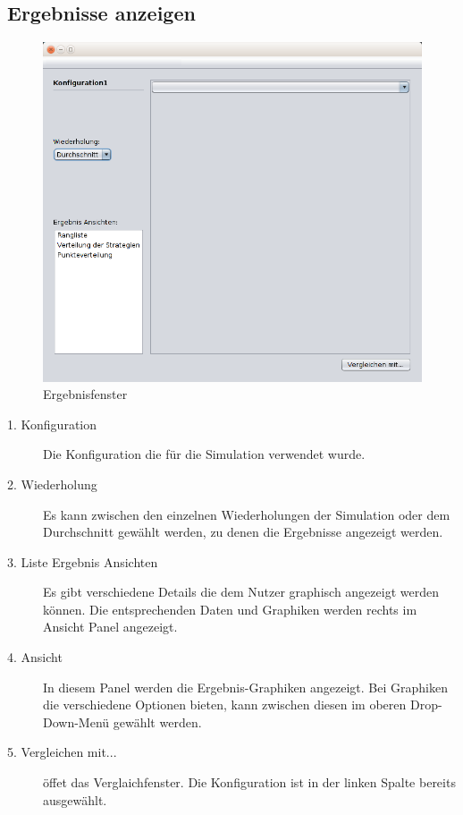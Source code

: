\pagebreak


\subsection{Ergebnisse anzeigen}

\begin{figure}[!hp] 
  \centering
     \includegraphics[width=1.1\textwidth]{GUI_Entwurf/Ergebnisfenster(1).png}
  \caption{Ergebnisfenster}
  \label{fig:Bild7}
\end{figure}

\begin{description}

\item[1. Konfiguration] Die Konfiguration die für die Simulation verwendet wurde.

\item[2. Wiederholung] Es kann zwischen den einzelnen Wiederholungen der Simulation oder dem Durchschnitt gewählt werden, zu denen die Ergebnisse angezeigt werden.

\item[3. Liste Ergebnis Ansichten] Es gibt verschiedene Details die dem Nutzer graphisch angezeigt werden können. Die entsprechenden Daten und Graphiken werden rechts im Ansicht Panel angezeigt.

\item[4. Ansicht] In diesem Panel werden die Ergebnis-Graphiken angezeigt. Bei Graphiken die verschiedene Optionen bieten, kann zwischen diesen im oberen Drop-Down-Menü gewählt werden.

\item[5. Vergleichen mit...] öffet das Verglaichfenster. Die Konfiguration ist in der linken Spalte bereits ausgewählt.

\end{description}

